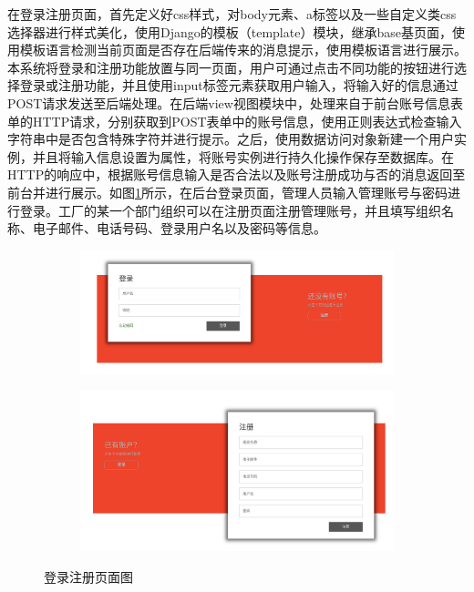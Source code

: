 在登录注册页面，首先定义好css样式，对body元素、a标签以及一些自定义类css选择器进行样式美化，使用Django的模板（template）模块，继承base基页面，使用模板语言检测当前页面是否存在后端传来的消息提示，使用模板语言进行展示。本系统将登录和注册功能放置与同一页面，用户可通过点击不同功能的按钮进行选择登录或注册功能，并且使用input标签元素获取用户输入，将输入好的信息通过POST请求发送至后端处理。在后端view视图模块中，处理来自于前台账号信息表单的HTTP请求，分别获取到POST表单中的账号信息，使用正则表达式检查输入字符串中是否包含特殊字符并进行提示。之后，使用数据访问对象新建一个用户实例，并且将输入信息设置为属性，将账号实例进行持久化操作保存至数据库。在HTTP的响应中，根据账号信息输入是否合法以及账号注册成功与否的消息返回至前台并进行展示。如图\ref{fig:loginregisterf}所示，在后台登录页面，管理人员输入管理账号与密码进行登录。工厂的某一个部门组织可以在注册页面注册管理账号，并且填写组织名称、电子邮件、电话号码、登录用户名以及密码等信息。

\begin{figure}[H]
    \centering
    \begin{subfigure}{.45\textwidth}
        \centering
        \includegraphics[width=\textwidth]{figures/5login.png}
    \end{subfigure}
    \qquad
    \begin{subfigure}{.45\textwidth}
        \centering
        \includegraphics[width=\textwidth]{figures/5register.png}
    \end{subfigure}
    \caption{登录注册页面图}
    \label{fig:loginregisterf}
\end{figure}

